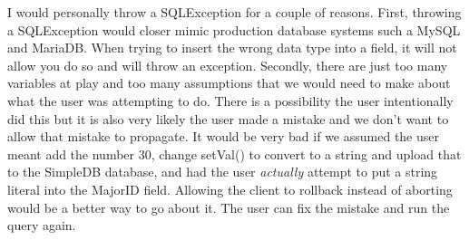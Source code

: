\documentclass [letter,12pt] {article}
\begin{document}
    I would personally throw a SQLException for a couple of reasons. First, throwing
    a SQLException would closer mimic production database systems such a MySQL and 
    MariaDB. When trying to insert the wrong data type into a field, it will not 
    allow you do so and will throw an exception. Secondly, there are just too many
    variables at play and too many assumptions that we would need to make about 
    what the user was attempting to do. There is a possibility the user intentionally 
    did this but it is also very likely the user made a mistake and we don't want to 
    allow that mistake to propagate. It would be very bad if we assumed the user meant 
    add the number 30, change setVal() to convert to a string and upload that to the 
    SimpleDB database, and had the user \textit{actually} attempt to put a string 
    literal into the MajorID field. Allowing the client to rollback instead of aborting 
    would be a better way to go about it. The user can fix the mistake and
    run the query again.
    
    
\end{document}
